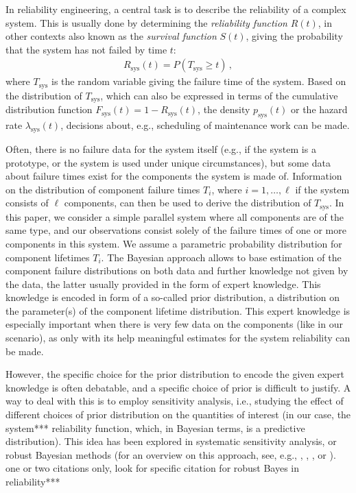 \documentclass[12pt,a4paper,twocolumn,fleqn]{narms}
\newcommand{\comments}[1]{{\small\color{gray} #1}}
\begin{document}
In reliability engineering, a central task is to describe the reliability of a complex system.
This is usually done by determining the \emph{reliability function} $R(t)$,
in other contexts also known as the \emph{survival function} $S(t)$,
giving the probability that the system has not failed by time $t$:
\begin{align}
R_\text{sys}(t) = P(T_\text{sys} \geq t)\,,
\end{align}
where $T_\text{sys}$ is the random variable giving the failure time of the system. %
Based on the distribution of $T_\text{sys}$, which can also be expressed
in terms of the cumulative distribution function $F_\text{sys}(t) = 1 - R_\text{sys}(t)$,
the density $p_\text{sys}(t)$ or the hazard rate $\lambda_\text{sys}(t)$,
decisions about, e.g., scheduling of maintenance work can be made.

Often, there is no failure data for the system itself
(e.g., if the system is a prototype, or the system is used under unique circumstances),
but some data about failure times exist for the components the system is made of.
Information on the distribution of component failure times $T_i$,
where $i = 1, \ldots, \ell$ if the system consists of $\ell$ components,
can then be used to derive the distribution of $T_\text{sys}$.
In this paper, we consider a simple parallel system
where all components are of the same type,
and our observations consist solely of the failure times of one or more components in this system.
%
We assume a parametric probability distribution for component lifetimes $T_i$. 
The Bayesian approach allows to base estimation of the component failure distributions
on both data and further knowledge not given by the data,
the latter usually provided in the form of expert knowledge.
This knowledge is encoded in form of a so-called prior distribution,
a distribution on the parameter(s) of the component lifetime distribution.
This expert knowledge is especially important when there is very few data on the components (like in our scenario),
as only with its help meaningful estimates for the system reliability can be made.

However, the specific choice for the prior distribution to encode the given expert knowledge is often debatable,
and a specific choice of prior is difficult to justify.
A way to deal with this is to employ sensitivity analysis,
i.e., studying the effect of different choices of prior distribution on the quantities of interest
(in our case, the system*** reliability function, which, in Bayesian terms, is a predictive distribution).
This idea has been explored in systematic sensitivity analysis, or robust Bayesian methods
(for an overview on this approach, see, e.g.,
, , , or ).
\comments{one or two citations only, look for specific citation for robust Bayes in reliability***}
\end{document}
